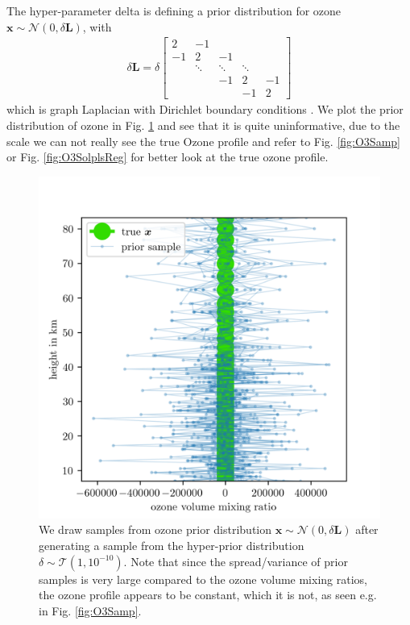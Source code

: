 The hyper-parameter delta is defining a prior distribution for ozone $\bm{x} \sim \mathcal{N}(0,\delta \bm{L})$, with 
\begin{align}
	\delta \bm{L} =
	\delta
	\begin{bmatrix}
		2 & -1 & & &  \\
		-1 & 2 & -1 & &   \\
		& \ddots & \ddots & \ddots &\\ 
		& & -1 & 2 & -1  \\
		& & & -1 & 2 
	\end{bmatrix} 
	\label{eq:GLapl} 
\end{align}
which is graph Laplacian with Dirichlet boundary conditions \cite{wang2015trend}.
We plot the prior distribution of ozone in Fig. \ref{fig:O3Prior} and see that it is quite uninformative, due to the scale we can  not really see the true Ozone profile and refer to Fig. \ref{fig:O3Samp} or Fig. \ref{fig:O3SolplsReg} for better look at the true ozone profile.
\begin{figure}[ht!]
	\centering
	\includegraphics{OzonePrior.png}
	\caption[Samples from ozone prior distribution.]{We draw samples from ozone prior distribution $\bm{x} \sim \mathcal{N}(0,\delta \bm{L})$ after generating a sample from the hyper-prior distribution $\delta \sim \mathcal{T}(1,10^{-10})$. Note that since the spread/variance of prior samples is very large compared to the ozone volume mixing ratios, the ozone profile appears to be constant, which it is not, as seen e.g. in Fig. \ref{fig:O3Samp}.}
	\label{fig:O3Prior}
\end{figure}

